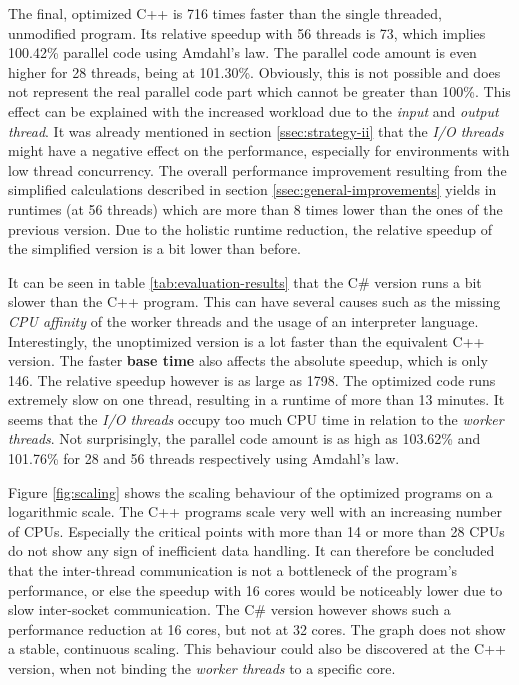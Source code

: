 The final, optimized C++ is 716 times faster than the single threaded, unmodified program. Its relative speedup with 56 threads is 73, which implies 100.42\% parallel code using Amdahl's law. The parallel code amount is even higher for 28 threads, being at 101.30\%. Obviously, this is not possible and does not represent the real parallel code part which cannot be greater than 100\%. This effect can be explained with the increased workload due to the \textit{input} and \textit{output thread}. It was already mentioned in section \ref{ssec:strategy-ii} that the \textit{I/O threads} might have a negative effect on the performance, especially for environments with low thread concurrency. The overall performance improvement resulting from the simplified calculations described in section \ref{ssec:general-improvements} yields in runtimes (at 56 threads) which are more than 8 times lower than the ones of the previous version. Due to the holistic runtime reduction, the relative speedup of the simplified version is a bit lower than before.

It can be seen in table \ref{tab:evaluation-results} that the C\# version runs a bit slower than the C++ program. This can have several causes such as the missing \textit{CPU affinity} of the worker threads and the usage of an interpreter language. Interestingly, the unoptimized version is a lot faster than the equivalent C++ version. The faster \textbf{base time} also affects the absolute speedup, which is only 146. The relative speedup however is as large as 1798. The optimized code runs extremely slow on one thread, resulting in a runtime of more than 13 minutes. It seems that the \textit{I/O threads} occupy too much CPU time in relation to the \textit{worker threads}. Not surprisingly, the parallel code amount is as high as 103.62\% and 101.76\% for 28 and 56 threads respectively using Amdahl's law.

Figure \ref{fig:scaling} shows the scaling behaviour of the optimized programs on a logarithmic scale. The C++ programs scale very well with an increasing number of CPUs. Especially the critical points with more than 14 or more than 28 CPUs do not show any sign of inefficient data handling. It can therefore be concluded that the inter-thread communication is not a bottleneck of the program's performance, or else the speedup with 16 cores would be noticeably lower due to slow inter-socket communication. The C\# version however shows such a performance reduction at 16 cores, but not at 32 cores. The graph does not show a stable, continuous scaling. This behaviour could also be discovered at the C++ version, when not binding the \textit{worker threads} to a specific core.

